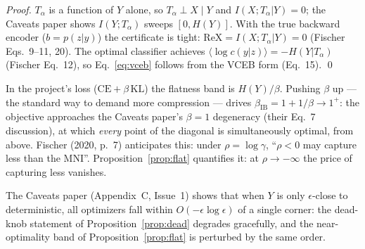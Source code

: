 \begin{proof}
$T_\alpha$ is a function of $Y$ alone, so $T_\alpha \perp X \mid Y$ and
$I(X;T_\alpha|Y) = 0$; the Caveats paper shows $I(Y;T_\alpha)$ sweeps $[0, H(Y)]$.
With the true backward encoder ($b = p(z|y)$) the certificate is tight:
$\mathrm{ReX} = I(X;T_\alpha|Y) = 0$ (Fischer Eqs.~9--11, 20). The optimal classifier
achieves $\langle \log c(y|z)\rangle = -H(Y|T_\alpha)$ (Fischer Eq.~12), so
Eq.~\eqref{eq:vceb} follows from the VCEB form (Eq.~15). \hfill\qed
\end{proof}

\begin{remark}\label{rem:convention}
In the project's loss ($\mathrm{CE} + \beta\,\mathrm{KL}$) the flatness band is
$H(Y)/\beta$. Pushing $\beta$ up --- the standard way to demand more compression --- drives
$\beta_{\mathrm{IB}} = 1 + 1/\beta \to 1^+$: the objective approaches the Caveats paper's
$\beta = 1$ degeneracy (their Eq.~7 discussion), at which \emph{every} point of the
diagonal is simultaneously optimal, from above. Fischer (2020, p.~7) anticipates this:
under $\rho = \log\gamma$, ``$\rho < 0$ may capture less than the MNI''.
Proposition~\ref{prop:flat} quantifies it: at $\rho \to -\infty$ the price of capturing
less vanishes.
\end{remark}

\begin{remark}\label{rem:approx}
The Caveats paper (Appendix~C, Issue~1) shows that when $Y$ is only $\epsilon$-close to
deterministic, all optimizers fall within $O(-\epsilon\log\epsilon)$ of a single corner:
the dead-knob statement of Proposition~\ref{prop:dead} degrades gracefully, and the
near-optimality band of Proposition~\ref{prop:flat} is perturbed by the same order.
\end{remark}

